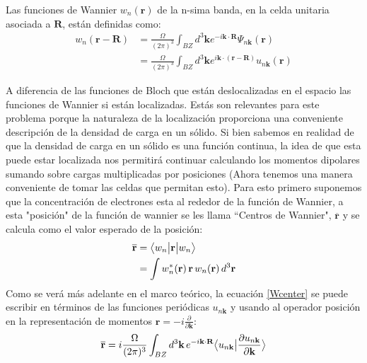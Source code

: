 Las funciones de Wannier $w_n(\textbf{r})$ de la n-sima banda, en la celda unitaria asociada a $\textbf{R}$, están definidas como:
\begin{equation}
\begin{split}
     w_n(\textbf{r} - \textbf{R}) &= \frac{\Omega}{(2\pi)^3} \int_{BZ} d^3\textbf{k} e^{-i \textbf{k} \cdot \textbf{R}} \Psi_{n\textbf{k}}(\textbf{r})\\
     &= \frac{\Omega}{(2\pi)^3} \int_{BZ} d^3\textbf{k} e^{i \textbf{k} \cdot (\textbf{r} - \textbf{R})} u_{n\textbf{k}}(\textbf{r})
\end{split}
\end{equation}

A diferencia de las funciones de Bloch que están deslocalizadas en el espacio las funciones de Wannier si están localizadas. Estás son relevantes para este problema porque la naturaleza de la localización proporciona una conveniente descripción de la densidad de carga en un sólido. Si bien sabemos en
realidad de que la densidad de carga en un sólido es una función continua, la idea de que esta puede estar localizada nos permitirá continuar calculando los momentos dipolares sumando sobre cargas multiplicadas por posiciones (Ahora tenemos una manera conveniente de tomar las celdas que permitan esto).
Para esto primero suponemos que la concentración de electrones esta al rededor de la función de Wannier, a esta "posición" de la función de wannier se les llama ``Centros de Wannier", $\overline{\textbf{r}}$ y se calcula como el valor esperado de la posición:
\begin{equation}
\label{Wcenter}
\begin{split}
        \overline{\textbf{r}} &= \big \langle{w_n}\big | {\textbf{r}} \big | {w_n} \big \rangle\\
        &= \int w^*_n(\textbf{r})\,\textbf{r}\, w_n(\textbf{r})\, d^3\textbf{r}
\end{split}
\end{equation}
Como se verá más adelante en el marco teórico, la ecuación \ref{Wcenter} se puede escribir en términos de las funciones periódicas $u_{n\textbf{k}}$ y usando al operador posición en la representación de momentos $\textbf{r} = -i\frac{\partial}{\partial\textbf{k}}$:
\begin{equation}
    \overline{\textbf{r}} = i\frac{\Omega}{(2\pi)^3} \int_{BZ} d^3\textbf{k}\,e^{-i\textbf{k}\cdot\textbf{R}}\big \langle{u_{n\textbf{k}}}\big | {\frac{\partial u_{n\textbf{k}} }{\partial\textbf{k}}} \big \rangle
\end{equation}

